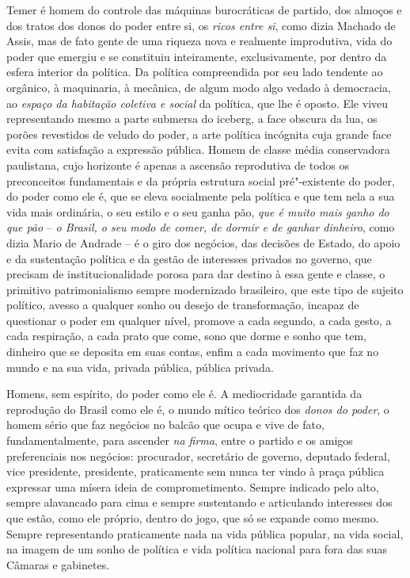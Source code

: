 Temer é homem do controle das máquinas burocráticas de partido, dos
almoços e dos tratos dos donos do poder entre si, os \emph{ricos entre
si}, como dizia Machado de Assis, mas de fato gente de uma riqueza nova
e realmente improdutiva, vida do poder que emergiu e se constituiu
inteiramente, exclusivamente, por dentro da esfera interior da política.
Da política compreendida por seu lado tendente ao orgânico, à
maquinaria, à mecânica, de algum modo algo vedado à democracia, ao
\emph{espaço da habitação coletiva e social} da política, que lhe é
oposto. Ele viveu representando mesmo a parte submersa do iceberg, a
face obscura da lua, os porões revestidos de veludo do poder, a arte
política incógnita cuja grande face evita com satisfação a expressão
pública. Homem de classe média conservadora paulistana, cujo horizonte é
apenas a ascensão reprodutiva de todos os preconceitos fundamentais e da
própria estrutura social pré"-existente do poder, do poder como ele é,
que se eleva socialmente pela política e que tem nela a sua vida mais
ordinária, o seu estilo e o seu ganha pão, \emph{que é muito mais ganho
do que pão} -- \emph{o Brasil, o seu} \emph{modo de comer, de dormir e
de ganhar dinheiro}, como dizia Mario de Andrade -- é o giro dos
negócios, das decisões de Estado, do apoio e da sustentação política e
da gestão de interesses privados no governo, que precisam de
institucionalidade porosa para dar destino à essa gente e classe, o
primitivo patrimonialismo sempre modernizado brasileiro, que este tipo
de sujeito político, avesso a qualquer sonho ou desejo de transformação,
incapaz de questionar o poder em qualquer nível, promove a cada segundo,
a cada gesto, a cada respiração, a cada prato que come, sono que dorme e
sonho que tem, dinheiro que se deposita em suas contas, enfim a cada
movimento que faz no mundo e na sua vida, privada pública, pública
privada.

Homens, sem espírito, do poder como ele é. A mediocridade garantida da
reprodução do Brasil como ele é, o mundo mítico teórico dos \emph{donos
do poder}, o homem sério que faz negócios no balcão que ocupa e vive de
fato, fundamentalmente, para ascender \emph{na firma}, entre o partido e
os amigos preferenciais nos negócios: procurador, secretário de governo,
deputado federal, vice presidente, presidente, praticamente sem nunca
ter vindo à praça pública expressar uma mísera ideia de comprometimento.
Sempre indicado pelo alto, sempre alavancado para cima e sempre
sustentando e articulando interesses dos que estão, como ele próprio,
dentro do jogo, que só se expande como mesmo. Sempre representando
praticamente nada na vida pública popular, na vida social, na imagem de
um sonho de política e vida política nacional para fora das suas Câmaras
e gabinetes.

